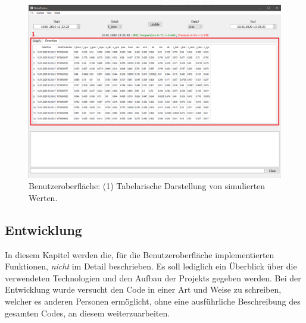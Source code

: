 \begin{figure}[H]
  \centering
  \includegraphics[width=\textwidth]{./img/ui_simulated_table}
  \caption{Benutzeroberfläche: (1) Tabelarische Darstellung von simulierten Werten.}\label{fig:ui_table}
\end{figure}

\subsection{Entwicklung}\label{sec:bo_entwicklung}
In diesem Kapitel werden die, für die Benutzeroberfläche implementierten Funktionen, \emph{nicht} im Detail beschrieben. Es soll lediglich ein Überblick über die verwendeten Technologien und den Aufbau der Projekts gegeben werden. Bei der Entwicklung wurde versucht den Code in einer Art und Weise zu schreiben, welcher es anderen Personen ermöglicht, ohne eine ausführliche Beschreibung des gesamten Codes, an diesem weiterzuarbeiten.

